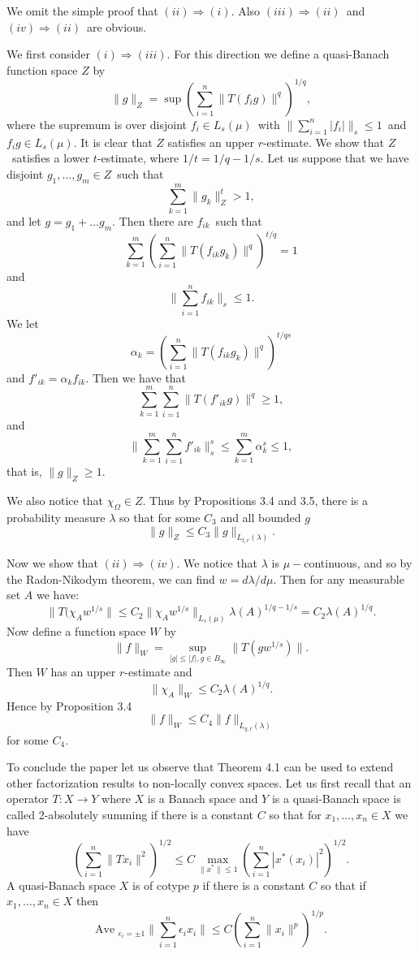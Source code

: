 We omit the simple proof that $(ii)\Rightarrow (i)$.  Also
$(iii)\Rightarrow (ii)$\ and $(iv)\Rightarrow(ii)$\ are obvious.
 
We first consider $(i)\Rightarrow (iii).$ For this direction we define a
quasi-Banach function space $Z$ by $$ \|g\|_Z = \sup \left( \sum_{i=1}^n
\|T(f_ig)\|^q \right)^{1/q} ,$$ where the supremum is over disjoint
$f_i\in L_s(\mu)$\ with $\|\sum_{i=1}^n |f_i| \|_s \le 1$\ and $f_ig \in
L_s(\mu)$.  It is clear that $Z$ satisfies an upper $r$-estimate.  We
show that $Z$\ satisfies a lower $t$-estimate, where $1/t = 1/q - 1/s$.
Let us suppose that we have disjoint $g_1,\ldots,g_m \in Z$\ such that
$$ \sum_{k=1}^m \|g_k\|_Z^t > 1 ,$$ and let $g=g_1+\ldots g_m$.  Then
there are $f_{ik}$\ such that $$ \sum_{k=1}^m \left(\sum_{i=1}^n
\|T(f_{ik}g_k)\|^q \right)^{t/q} = 1 $$ and $$ \| \sum_{i=1}^n f_{ik}
\|_s \le 1 .$$ We let $$ \alpha_k = \left(\sum_{i=1}^n
\|T(f_{ik}g_k)\|^q \right)^{t/qs} $$ and $f'_{ik} = \alpha_k f_{ik}$.
Then we have that $$ \sum_{k=1}^m \sum_{i=1}^n \|T(f'_{ik} g)\|^q \ge 1,
$$ and $$ \| \sum_{k=1}^m \sum_{i=1}^n f'_{ik} \|_s^s \le \sum_{k=1}^m
\alpha_k^s \le 1 ,$$ that is, $\| g\|_Z \ge 1 $.
 
We also notice that $\chi_{\Omega}\in Z$.  Thus by Propositions 3.4 and
3.5, there is a probability measure $\lambda$ so that for some $C_3$ and
all bounded $g$ $$ \|g\|_Z \le C_3 \|g\|_{L_{t,r}(\lambda)} .$$
 
Now we show that $ (ii) \Rightarrow (iv) .$ We notice that $\lambda$ is
$\mu-$continuous, and so by the Radon-Nikodym theorem, we can find
$w=d\lambda/d\mu$.  Then for any measurable set $A$ we have:  $$
\|T(\chi_A w^{1/s}\| \le C_2 \|\chi_A w^{1/s}\|_{L_{s}(\mu)}
\lambda(A)^{1/q-1/s} = C_2 \lambda(A)^{1/q}.$$ Now define a function
space $W$ by $$ \|f\|_W =\sup_{|g|\le |f|, g\in
B_{\infty}}\|T(gw^{1/s})\|.$$ Then $W$ has an upper $r$-estimate and $$
\|\chi_A\|_W \le C_2 \lambda(A)^{1/q} .$$ Hence by Proposition 3.4 $$
\|f\|_W \le C_4 \|f\|_{L_{q,r}(\lambda)}$$ for some $C_4$.
\bull\enddemo
 
To conclude the paper let us observe that Theorem 4.1 can be used to
extend other factorization results to non-locally convex spaces.
Let us first recall that an operator $T:X\to Y$ where $X$ is a Banach
space and $Y$ is a quasi-Banach space is called 2-absolutely summing if
there is a constant $C$ so that for $x_1,\ldots,x_n\in X$ we have
$$ (\sum_{i=1}^n \|Tx_i\|^2)^{1/2}\le C\max_{\|x^*\|\le
1}(\sum_{i=1}^n|x^*(x_i)|^2)^{1/2}.$$
A quasi-Banach space $X$ is of cotype $p$ if there is a constant $C$ so
that if $x_1,\ldots,x_n\in X$ then
$$ \text{Ave }_{\epsilon_i=\pm1}\|\sum_{i=1}^n\epsilon_ix_i\| \le
C(\sum_{i=1}^n\|x_i\|^p)^{1/p}.$$
 
